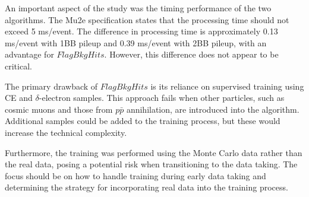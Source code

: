 An important aspect of the study was the 
timing performance of the two algorithms. The Mu2e specification states 
that the processing time should not exceed 5 ms/event. The 
difference in processing time is approximately 0.13 ms/event with 
1BB pileup and 0.39 ms/event with 2BB pileup, with an advantage for $FlagBkgHits$. 
However, this difference does not appear to be critical.

The primary drawback of $FlagBkgHits$ is its 
reliance on supervised training using 
CE and $\delta$-electron samples. This 
approach fails when other particles, such 
as cosmic muons and those from $p\bar{p}$ 
annihilation, are introduced into the algorithm.
Additional samples could be added to the training 
process, but these would increase the technical complexity. 

Furthermore, the training was performed using the  
Monte Carlo data rather than the real data, 
posing a potential risk when transitioning 
to the data taking. The focus should be on how 
to handle training during early data taking and 
determining the strategy for incorporating real data into the training process.

